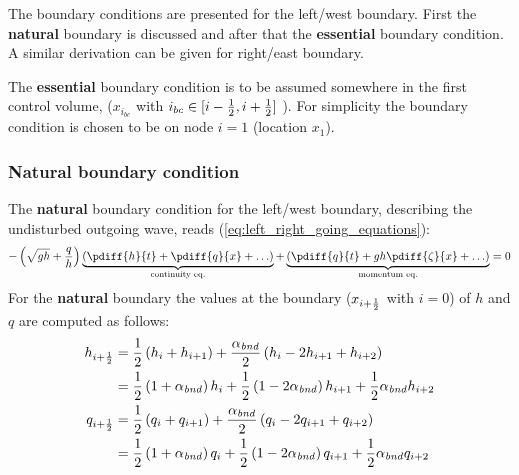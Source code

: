 The boundary conditions are presented for the left/west boundary.
First the \textbf{natural} boundary is discussed and after that the \textbf{essential} boundary condition.
A similar derivation can be given for right/east boundary.

The \textbf{essential} boundary condition is to be assumed somewhere in the first control volume, ($x_{i_{bc}}$ with $i_{bc} \in [i-\frac{1}{2}, i+\frac{1}{2}]$ ).
For simplicity the boundary condition is chosen to be on node $i=1$ (location $x_{1}$).

\subsubsection{Natural boundary condition}

The \textbf{natural} boundary condition for the left/west boundary, describing the undisturbed outgoing wave, reads (\autoref{eq:left_right_going_equations}):
\begin{align}
- \left(\sqrt{gh} + \frac{q}{h}\right) \underbrace{ \left(\pdiff{h}{t} + \pdiff{q}{x} + \ldots \right) }_{\text{continuity eq.}} + \underbrace{\left(\pdiff{q}{t} + g h \pdiff{\zeta}{x}+\ldots\right)}_{\text{momentum eq.}} = 0
\end{align}
For the \textbf{natural} boundary the values at the boundary ($x_{i+\frac{1}{2}}$ with $i=0$) of $h$ and $q$ are computed as follows:
%
\begin{align}
    h_{i+\frac{1}{2}} & = \frac{1}{2} \left( h_{i} +  h_{i+1} \right) +
    \frac{\alpha_{\it bnd}}{2} \left( h_{i}
    - 2 h_{i+1} + h_{i+2} \right)
    \nonumber \\*
    & = \frac{1}{2} \left( 1 + \alpha_{\it bnd} \right) h_{i} +
    \frac{1}{2} \left( 1 - 2\alpha_{\it bnd} \right) h_{i+1} +
    \frac{1}{2} \alpha_{\it bnd} h_{i+2}\label{eq:h_at_left_boundary}
    \\
    q_{i+\frac{1}{2}} & =  \frac{1}{2} \left( q_{i} + q_{i+1}\right)
    + \frac{\alpha_{\it bnd}}{2} \left( q_{i}
    - 2 q_{i+1} + q_{i+2} \right)
    \nonumber \\*
    & = \frac{1}{2} \left( 1 + \alpha_{\it bnd} \right) q_{i} +
    \frac{1}{2} \left( 1 - 2\alpha_{\it bnd} \right) q_{i+1} +
    \frac{1}{2} \alpha_{\it bnd} q_{i+2}\label{eq:q_at_left_boundary}
\end{align}


